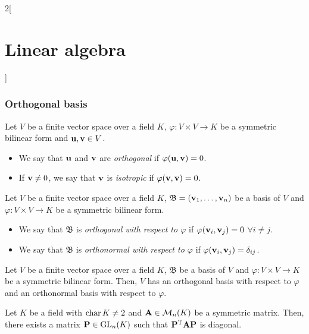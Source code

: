 \documentclass[../../../main.tex]{subfiles}
\begin{document}
\begin{multicols}{2}[\section{Linear algebra}]
  \subsubsection*{Orthogonal basis}
  \begin{definition}\label{ALG-isotrop}
    Let $V$ be a finite vector space over a field $K$, $\varphi:V\times V\rightarrow K$ be a symmetric bilinear form and $\vb{u},\vb{v}\in V$.
    \begin{itemize}
      \item We say that $\vb{u}$ and $\vb{v}$ are \textit{orthogonal} if $\varphi(\vb{u},\vb{v})=0$.
      \item If $\vb{v}\ne 0$, we say that $\vb{v}$ is \textit{isotropic} if $\varphi(\vb{v},\vb{v})=0$.
    \end{itemize}
  \end{definition}
  \begin{definition}
    Let $V$ be a finite vector space over a field $K$, $\mathfrak{B}=(\vb{v}_1,\ldots,\vb{v}_n)$ be a basis of $V$ and $\varphi:V\times V\rightarrow K$ be a symmetric bilinear form.
    \begin{itemize}
      \item We say that $\mathfrak{B}$ is \textit{orthogonal with respect to $\varphi$} if $\varphi(\vb{v}_i,\vb{v}_j)=0$ $\forall i\ne j$.
      \item We say that $\mathfrak{B}$ is \textit{orthonormal with respect to $\varphi$} if $\varphi(\vb{v}_i,\vb{v}_j)=\delta_{ij}$.
    \end{itemize}
  \end{definition}
  \begin{theorem}
    Let $V$ be a finite vector space over a field $K$, $\mathfrak{B}$ be a basis of $V$ and $\varphi:V\times V\rightarrow K$ be a symmetric bilinear form. Then, $V$ has an orthogonal basis with respect to $\varphi$ and an orthonormal basis with respect to $\varphi$.
  \end{theorem}
  \begin{corollary}
    Let $K$ be a field with $\operatorname{char} K\ne 2$ and $\vb{A}\in\mathcal{M}_n(K)$ be a symmetric matrix. Then, there exists a matrix $\vb{P}\in\mathrm{GL}_n(K)$ such that $\vb{P}^{\mathrm{T}}\vb{A}\vb{P}$ is diagonal.
  \end{corollary}

\end{multicols}
\end{document}

